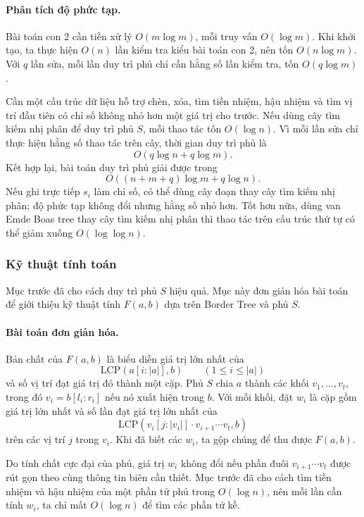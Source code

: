 \documentclass[11pt]{article}
\begin{document}
\paragraph{Phân tích độ phức tạp.}
Bài toán con 2 cần tiền xử lý \(O(m\log m)\), mỗi truy vấn \(O(\log m)\). Khi
khởi tạo, ta thực hiện \(O(n)\) lần kiểm tra kiểu bài toán con 2, nên tốn
\(O(n\log m)\). Với \(q\) lần sửa, mỗi lần duy trì phủ chỉ cần hằng số lần kiểm
tra, tốn \(O(q\log m)\).

Cần một cấu trúc dữ liệu hỗ trợ chèn, xóa, tìm tiền nhiệm, hậu nhiệm và tìm vị
trí đầu tiên có chỉ số không nhỏ hơn một giá trị cho trước. Nếu dùng cây tìm
kiếm nhị phân để duy trì phủ \(S\), mỗi thao tác tốn \(O(\log n)\). Vì mỗi lần
sửa chỉ thực hiện hằng số thao tác trên cây, thời gian duy trì phủ là
\[
  O(q\log n+q\log m).
\]
Kết hợp lại, bài toán duy trì phủ giải được trong
\[
  O((n+m+q)\log m+q\log n).
\]
Nếu ghi trực tiếp \(s_i\) làm chỉ số, có thể dùng cây đoạn thay cây tìm kiếm
nhị phân; độ phức tạp không đổi nhưng hằng số nhỏ hơn. Tốt hơn nữa, dùng van
Emde Boas tree thay cây tìm kiếm nhị phân thì thao tác trên cấu trúc thứ tự có
thể giảm xuống \(O(\log\log n)\).

\subsubsection{Kỹ thuật tính toán}

Mục trước đã cho cách duy trì phủ \(S\) hiệu quả. Mục này đơn giản hóa bài toán
để giới thiệu kỹ thuật tính \(F(a,b)\) dựa trên Border Tree và phủ \(S\).

\paragraph{Bài toán đơn giản hóa.}
Bản chất của \(F(a,b)\) là biểu diễn giá trị lớn nhất của
\[
  \mathrm{LCP}(a[i:|a|],b)\qquad (1\le i\le |a|)
\]
và số vị trí đạt giá trị đó thành một cặp. Phủ \(S\) chia \(a\) thành các khối
\(v_1,\ldots,v_t\), trong đó \(v_i=b[l_i:r_i]\) nếu nó xuất hiện trong \(b\).
Với mỗi khối, đặt \(w_i\) là cặp gồm giá trị lớn nhất và số lần đạt giá trị lớn
nhất của
\[
  \mathrm{LCP}(v_i[j:|v_i|]\cdot v_{i+1}\cdots v_t,b)
\]
trên các vị trí \(j\) trong \(v_i\). Khi đã biết các \(w_i\), ta gộp chúng để
thu được \(F(a,b)\).

Do tính chất cực đại của phủ, giá trị \(w_i\) không đổi nếu phần đuôi
\(v_{i+1}\cdots v_t\) được rút gọn theo cùng thông tin biên cần thiết. Mục trước
đã cho cách tìm tiền nhiệm và hậu nhiệm của một phần tử phủ trong \(O(\log n)\),
nên mỗi lần cần tính \(w_i\), ta chỉ mất \(O(\log n)\) để tìm các phần tử kề.
\end{document}

